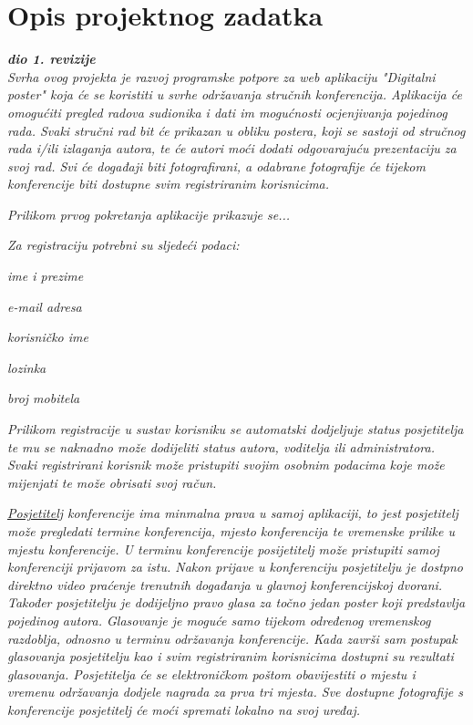 \chapter{Opis projektnog zadatka}
		
		\textbf{\textit{dio 1. revizije}}\\
		
		\textit{Svrha ovog projekta je razvoj programske potpore za web aplikaciju "Digitalni poster" koja će se koristiti u svrhe održavanja stručnih konferencija. Aplikacija će omogućiti pregled radova sudionika i dati im mogućnosti ocjenjivanja pojedinog rada. Svaki stručni rad bit će prikazan u obliku postera, koji se sastoji od stručnog rada i/ili izlaganja autora, te će autori moći dodati odgovarajuću prezentaciju za svoj rad. Svi će događaji biti fotografirani, a odabrane fotografije će tijekom konferencije biti dostupne svim registriranim korisnicima.}

		\textit{Prilikom prvog pokretanja aplikacije prikazuje se...}

		\textit{Za registraciju potrebni su sljedeći podaci:}

		\begin{packed_item}
			\item \textit{ime i prezime}
			\item \textit{e-mail adresa}
			\item \textit{korisničko ime}
			\item \textit{lozinka}
			\item \textit{broj mobitela}
		\end{packed_item}
		\textit{Prilikom registracije u sustav korisniku se automatski dodjeljuje status posjetitelja te mu se naknadno može dodijeliti status autora, voditelja ili administratora. Svaki registrirani korisnik može pristupiti svojim osobnim podacima koje može mijenjati te može obrisati svoj račun.}

		\textit{\underline{Posjetitelj} konferencije ima minmalna prava u samoj aplikaciji, to jest posjetitelj može pregledati termine konferencija, mjesto konferencija te vremenske prilike u mjestu konferencije. U terminu konferencije posijetitelj može pristupiti samoj konferenciji prijavom za istu. Nakon prijave u konferenciju posjetitelju je dostpno direktno video praćenje trenutnih događanja u glavnoj konferencijskoj dvorani. Također posjetitelju je dodijeljno pravo glasa za točno jedan poster koji predstavlja pojedinog autora. Glasovanje je moguće samo tijekom određenog vremenskog razdoblja, odnosno u terminu održavanja konferencije. Kada završi sam postupak glasovanja posjetitelju kao i svim registriranim korisnicima dostupni su rezultati glasovanja. Posjetitelja će se elektroničkom poštom obavijestiti o mjestu i vremenu održavanja dodjele nagrada za prva tri mjesta. Sve dostupne fotografije s konferencije posjetitelj će moći spremati lokalno na svoj uređaj.}

